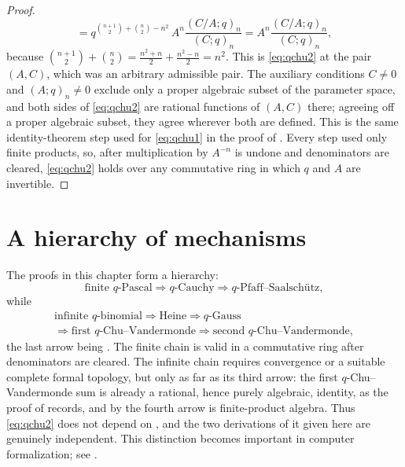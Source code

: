\documentclass[11pt,a4paper,oneside,openany]{book}
\theoremstyle{definition}
\theoremstyle{remark}
\begin{document}
\begin{proof}
\[ =q^{\binom{n+1}{2}+\binom n2-n^2}\,A^{n}\frac{(C/A;q)_n}{(C;q)_n}
 =A^{n}\frac{(C/A;q)_n}{(C;q)_n},
\]
because $\binom{n+1}{2}+\binom n2=\tfrac{n^2+n}{2}+\tfrac{n^2-n}{2}=n^2$.  This is \eqref{eq:qchu2} at the pair $(A,C)$, which was an arbitrary admissible pair.  The auxiliary conditions $C\ne0$ and $(A;q)_n\ne0$ exclude only a proper algebraic
subset of the parameter space, and both sides of \eqref{eq:qchu2} are
rational functions of $(A,C)$ there; agreeing off a proper algebraic
subset, they agree wherever both are defined.  This is the same
identity-theorem step used for \eqref{eq:qchu1} in the proof of
.
Every step used only finite products, so, after multiplication by $A^{-n}$ is undone and denominators are cleared, \eqref{eq:qchu2} holds over any commutative ring in which $q$ and $A$ are invertible.
\end{proof}


\section{A hierarchy of mechanisms}

The proofs in this chapter form a hierarchy:
\[
 \text{finite $q$-Pascal}
 \Longrightarrow \text{$q$-Cauchy}
 \Longrightarrow \text{$q$-Pfaff--Saalsch\"utz},
\]
while
\[
\begin{gathered}
 \text{infinite $q$-binomial}
 \Longrightarrow \text{Heine}
 \Longrightarrow \text{$q$-Gauss}\\
 \Longrightarrow \text{first $q$-Chu--Vandermonde}
 \Longrightarrow \text{second $q$-Chu--Vandermonde},
\end{gathered}
\]
the last arrow being .  The finite chain is valid in a commutative ring after denominators are cleared.  The infinite chain requires convergence or a suitable complete formal topology, but only as far as its third arrow: the first $q$-Chu--Vandermonde sum is already a rational, hence purely algebraic, identity, as the proof of  records, and by  the fourth arrow is finite-product algebra.  Thus \eqref{eq:qchu2} does not depend on , and the two derivations of it given here are genuinely independent.  This distinction becomes important in computer formalization; see .
\end{document}
